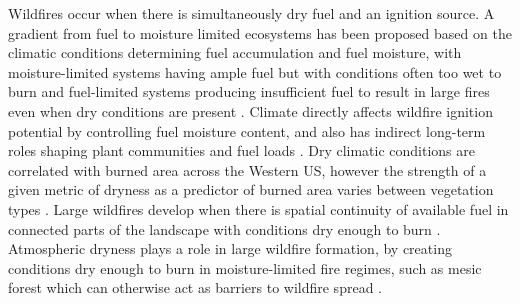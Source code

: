 \documentclass[11p]{article}
\begin{document}
Wildfires occur when there is simultaneously dry fuel and an ignition source. A gradient from fuel to moisture limited ecosystems has been proposed based on the climatic conditions determining fuel accumulation and fuel moisture, with moisture-limited systems having ample fuel but with conditions often too wet to burn and fuel-limited systems producing insufficient fuel to result in large fires even when dry conditions are present \citep{meynEnvironmentalDriversLarge2007,littellClimateChangeFuture2018}. Climate directly affects wildfire ignition potential by controlling fuel moisture content, and also has indirect long-term roles shaping plant communities and fuel loads \citep{littellReviewRelationshipsDrought2016}. Dry climatic conditions are correlated with burned area across the Western US, however the strength of a given metric of dryness as a predictor of burned area varies between vegetation types \citep{littellClimateWildfireArea2009,littellClimateChangeFuture2018}. Large wildfires develop when there is spatial continuity of available fuel in connected parts of the landscape with conditions dry enough to burn %
\citep{millerConnectivityForestFuels2000}. Atmospheric dryness plays a role in large wildfire formation, by creating conditions dry enough to burn in moisture-limited fire regimes, such as mesic forest which can otherwise act as barriers to wildfire spread \citep{cawsonAtmosphericDrynessRemoves2024}.
\end{document}
